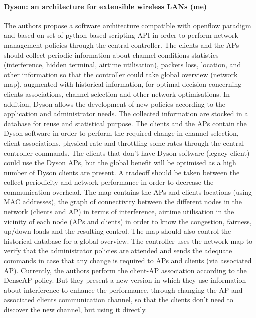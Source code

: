 \documentclass[journal,transmag]{IEEEtran}
\begin{document}
\paragraph{Dyson: an architecture for extensible wireless LANs \cite{10Dyson} (me)}
The authors propose a software architecture compatible with openflow paradigm and based on set of python-based scripting API in order to perform network management policies through the central controller. The clients and the APs should collect periodic information about channel conditions statistics (interference, hidden terminal, airtime utilisation), packets loss, location, and other information so that the controller could take global overview (network map), augmented with historical information, for optimal decision concerning clients associations, channel selection and other network optimisations. In addition, Dyson allows the development of new policies according to the application and administrator needs. The collected information are stocked in a database for reuse and statistical purpose. The clients and the APs contain the Dyson software in order to perform the required change in channel selection, client associations, physical rate and throttling some rates through the central controller commands. The clients that don't have Dyson software (legacy client) could use the Dyson APs, but the global benefit will be optimised as a high number of Dyson clients are present. A tradeoff should be taken between the collect periodicity and network performance in order to decrease the communication overhead. The map contains the APs and clients locations (using MAC addresses), the graph of connectivity between the different nodes in the network (clients and AP) in terms of interference, airtime utilisation in the vicinity of each node (APs and clients) in order to know the congestion, fairness, up/down loads and the resulting control. The map should also control the historical database for a global overview. The controller uses the network map to verify that the administrator policies are attended and sends the adequate commands in case that any change is required to APs and clients (via associated AP). Currently, the authors perform the client-AP association according to the DenseAP \cite{08Design_high_wifi_entreprise} policy. But they present a new version in which they use information about interference to enhance the performance, through changing the AP and associated clients communication channel, so that the clients don't need to discover the new channel, but using it directly. \\
\end{document}
